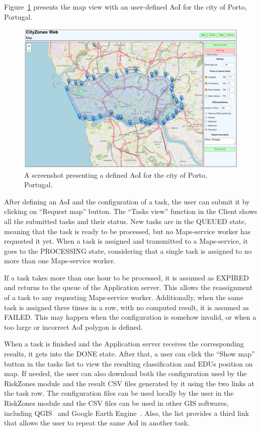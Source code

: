 \begin{refsection}
Figure~\ref{fig:web_map_aoi} presents the map view with an user-defined AoI for the city of Porto, Portugal.

\begin{figure}[htb]
  \centering
  \includegraphics[width=.8\textwidth]{Chapters/3-CityZones/img/cityzones_map_aoi.png}
  \caption{A screenshot presenting a defined AoI for the city of Porto, Portugal.}\label{fig:web_map_aoi}
\end{figure}

After defining an AoI and the configuration of a task, the user can submit it by clicking on ``Request map'' button.  The ``Tasks view'' function in the Client shows all the submitted tasks and their status. New tasks are in the QUEUED state, meaning that the task is ready to be processed, but no Maps-service worker has requested it yet. When a task is assigned and transmitted to a Maps-service, it goes to the PROCESSING state, considering that a single task is assigned to no more than one Maps-service worker.

If a task takes more than one hour to be processed, it is assumed as EXPIRED and returns to the queue of the Application server. This allows the reassignment of a task to any requesting Maps-service worker. Additionally, when the same task is assigned three times in a row, with no computed result, it is assumed as FAILED. This may happen when the configuration is somehow invalid, or when a too large or incorrect AoI polygon is defined.

When a task is finished and the Application server receives the corresponding results, it gets into the DONE state. After that, a user can click the ``Show map'' button in the tasks list to view the resulting classification and EDUs position on map. If needed, the user can also download both the configuration used by the RiskZones module and the result CSV files generated by it using the two links at the task row. The configuration files can be used locally by the user in the RiskZones module and the CSV files can be used in other GIS softwares, including QGIS~\cite{qgis} and Google Earth Engine~\cite{earth}. Also, the list provides a third link that allows the user to repeat the same AoI in another task.


\end{refsection}
